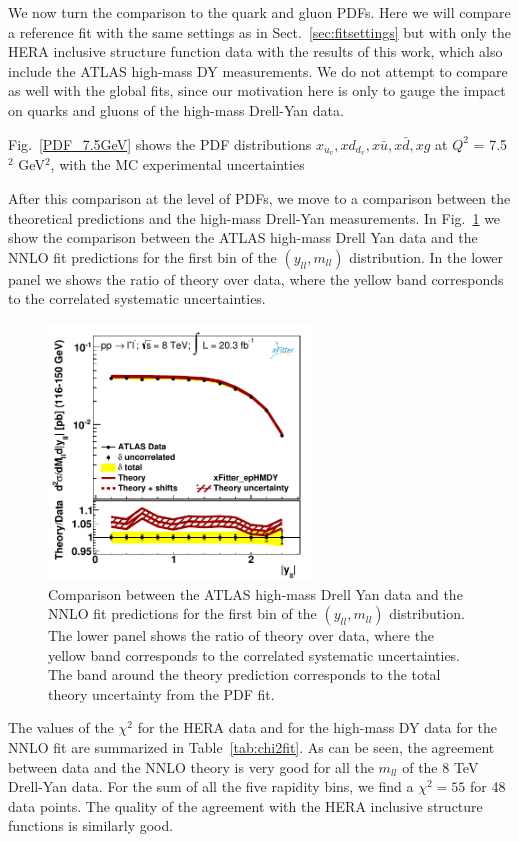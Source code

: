 We now turn the comparison to the quark and gluon PDFs.
%
Here we will compare a reference fit with the same settings as in Sect.~\ref{sec:fitsettings}
but with only the HERA inclusive structure function data with the results of this work,
which also include the ATLAS high-mass DY measurements.
%
We do not attempt to compare as well with the global fits, since our motivation here is only to
gauge the impact on quarks and gluons of the high-mass Drell-Yan data.

Fig.~\ref{PDF_7.5GeV}
shows the PDF distributions $x_{u_v},xd_{d_v},x\bar{u}, x\bar{d}, xg$ at $Q^{2}$ = 7.5$^{2}$ GeV$^{2}$,
with the MC experimental uncertainties

After this comparison at the level of PDFs, we move to a comparison between the theoretical
predictions and the high-mass Drell-Yan measurements.
%
In Fig.~\ref{hmDY_2D} we show the
comparison between the ATLAS high-mass Drell Yan data and the NNLO fit predictions
for the first bin of the $(y_{ll},m_{ll})$ distribution.
%
In the lower panel we shows the ratio of theory over data, where the yellow band
  corresponds to the correlated systematic uncertainties.

\begin{figure}[h]
\centering
\includegraphics[width=7cm]{plots/data_1.pdf} 
\caption{Comparison between the ATLAS high-mass Drell Yan data and the NNLO fit predictions
  for the first bin of the $(y_{ll},m_{ll})$ distribution.
  The lower panel shows the ratio of theory over data, where the yellow band
  corresponds to the correlated systematic uncertainties.
  The band around the theory prediction corresponds to the total
  theory uncertainty from the PDF fit.
}
\label{hmDY_2D}
\end{figure}

The values of the $\chi^2$ for the HERA data and for
the high-mass DY data for the NNLO fit
are summarized in Table~\ref{tab:chi2fit}.
%
As can be seen, the agreement between data and the NNLO theory
is very good for all the $m_{ll}$ of the 8 TeV Drell-Yan data.
%
For the sum of all the five rapidity bins, we find a $\chi^2=55$
for 48 data points.
%
The quality of the agreement with the HERA inclusive structure functions
is similarly good.

